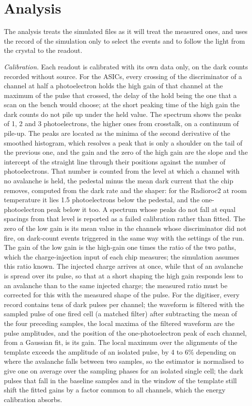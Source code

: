 \documentclass[11pt]{article}
\begin{document}
\section{Analysis}
\label{sec:analysis}

The analysis treats the simulated files as it will treat the measured ones,
and uses the record of the simulation only to select the events and to
follow the light from the crystal to the readout.

\emph{Calibration.} Each readout is calibrated with its own data only, on
the dark counts recorded without source. For the ASICs, every crossing of
the discriminator of a channel at half a photoelectron holds the high gain
of that channel at the maximum of the pulse that crossed, the delay of
the hold being the one that a scan on the bench would choose; at the short
peaking time of the high gain the dark counts do not pile up under the
held value. The spectrum shows the peaks of 1, 2 and 3 photoelectrons, the
higher ones from crosstalk, on a continuum of pile-up. The peaks are
located as the minima of the second derivative of the smoothed histogram,
which resolves a peak that is only a shoulder on the tail of the previous
one, and the gain and the zero of the high gain are the slope and the
intercept of the straight line through their positions against the number
of photoelectrons. That number is counted from the level at which a
channel with no avalanche is held, the pedestal minus the mean dark
current that the chip removes, computed from the dark rate and the
shaper: for the Radioroc2 at room temperature it lies 1.5 photoelectrons
below the pedestal, and the one-photoelectron peak below it too. A
spectrum whose peaks do not fall at equal spacings from that level is
reported as a failed calibration rather than fitted. The zero of the low gain is its mean value in the
channels whose discriminator did not fire, on dark-count events triggered
in the same way with the settings of the run. The gain of the low gain is
the high-gain one times the ratio of the two paths, which the
charge-injection input of each chip measures; the simulation assumes this
ratio known. The injected charge arrives at once, while that of an
avalanche is spread over its pulse, so that at a short shaping the high
gain responds less to an avalanche than to the same injected charge; the
measured ratio must be corrected for this with the measured shape of the
pulse. For the digitiser, every record contains tens of dark pulses per
channel; the waveform is filtered with the sampled pulse of one fired cell
(a matched filter) after subtracting the mean of the four preceding
samples, the local maxima of the filtered waveform are the pulse
amplitudes, and the position of the one-photoelectron peak of each
channel, from a Gaussian fit, is its gain. The local maximum over the
alignments of the template exceeds the amplitude of an isolated pulse, by
4 to 6\% depending on where the avalanche falls between two samples, so
the estimator is normalised to give one on average over the sampling
phases for an isolated single cell; the dark pulses that fall in the
baseline samples and in the window of the template still shift the fitted
gains by a factor common to all channels, which the energy calibration
absorbs.
\end{document}
